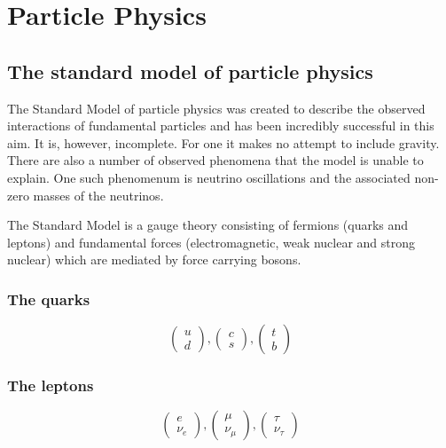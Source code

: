 \chapter{Particle Physics}
\label{chap:particle-physics}

\section{The standard model of particle physics}

The Standard Model of particle physics was created to describe the observed interactions of fundamental particles and has been incredibly successful in this aim. It is, however, incomplete. For one it makes no attempt to include gravity. There are also a number of observed phenomena that the model is unable to explain. One such phenomenum is neutrino oscillations and the associated non-zero masses of the neutrinos. 

The Standard Model is a   \CrossProduct {} gauge theory consisting of fermions (quarks and leptons) and fundamental forces (electromagnetic, weak nuclear and strong nuclear) which are mediated by force carrying bosons.

\subsection{The quarks}

\begin{equation}
  \begin{pmatrix}
    u \\
    d
  \end{pmatrix}
  ,
  \begin{pmatrix}
    c \\
    s
  \end{pmatrix}
  ,
  \begin{pmatrix}
    t \\
    b
  \end{pmatrix}
\end{equation}

\subsection{The leptons}

\begin{equation}
  \begin{pmatrix}
    e \\
    \nu_{e}
  \end{pmatrix}
  ,
  \begin{pmatrix}
    \mu \\
    \nu_{\mu}
  \end{pmatrix}
  ,
  \begin{pmatrix}
    \tau \\
    \nu_{\tau}
  \end{pmatrix}
\end{equation}


